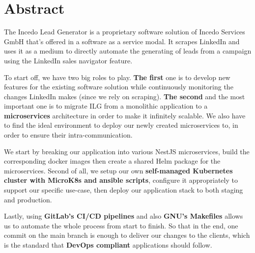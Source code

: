 \section*{Abstract}
The Incedo Lead Generator is a proprietary software solution of Incedo Services GmbH that's offered in a software as a service modal.
It scrapes LinkedIn and uses it as a medium to directly automate the generating of leads from a campaign using the LinkedIn sales navigator feature.

To start off, we have two big roles to play.
\textbf{The first} one is to develop new features for the existing software solution while continuously monitoring the changes LinkedIn makes (since we rely on scraping).
\textbf{The second} and the most important one is to migrate ILG from a monolithic application to a \textbf{microservices} architecture in order to make it infinitely scalable. We also have to find the ideal environment to deploy our newly created microservices to, in order to ensure their intra-communication.

We start by breaking our application into various NestJS microservices, build the corresponding docker images then create a shared Helm package for the microservices. Second of all, we setup our own \textbf{self-managed Kubernetes cluster with MicroK8s and ansible scripts}, configure it appropriately to support our specific use-case, then deploy our application stack to both staging and production.

Lastly, using \textbf{GitLab's CI/CD pipelines} and also \textbf{GNU's Makefiles} allows us to automate the whole process from start to finish.
So that in the end, one commit on the main branch is enough to deliver our changes to the clients, which is the standard that \textbf{DevOps compliant} applications should follow.

\newpage
